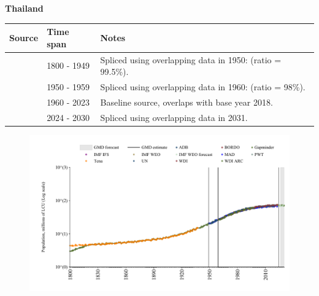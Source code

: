 \documentclass[12pt,a4paper,landscape]{article}
\begin{document}
\begin{adjustbox}{max totalsize={\paperwidth}{\paperheight},center}
\begin{minipage}[t][\textheight][t]{\textwidth}
\vspace*{0.5cm}
{}
\begin{center}
{\Large\bfseries Thailand}
\end{center}
\vspace{0.5cm}
\begin{table}[H]
\centering
\small
\begin{tabular}{|l|l|l|}
\hline
\textbf{Source} & \textbf{Time span} & \textbf{Notes} \\
\hline
\rowcolor{white}\cite{Gapminder}& 1800 - 1949 &Spliced using overlapping data in 1950: (ratio = 99.5\%).\\
\rowcolor{lightgray}\cite{IMF_IFS}& 1950 - 1959 &Spliced using overlapping data in 1960: (ratio = 98\%).\\
\rowcolor{white}\cite{WDI}& 1960 - 2023 &Baseline source, overlaps with base year 2018.\\
\rowcolor{lightgray}\cite{Gapminder}& 2024 - 2030 &Spliced using overlapping data in 2031.\\
\hline
\end{tabular}
\end{table}
\begin{figure}[H]
\centering
\includegraphics[width=\textwidth,height=0.6\textheight,keepaspectratio]{graphs/THA_pop.pdf}
\end{figure}
\end{minipage}
\end{adjustbox}
\end{document}

